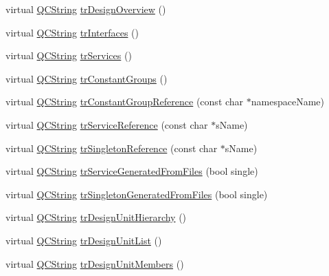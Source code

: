 \begin{DoxyCompactItemize}
\item 
virtual \mbox{\hyperlink{class_q_c_string}{Q\+C\+String}} \mbox{\hyperlink{class_translator_brazilian_a6c56d700811ad7ff20830d9b39981a77}{tr\+Design\+Overview}} ()
\item 
virtual \mbox{\hyperlink{class_q_c_string}{Q\+C\+String}} \mbox{\hyperlink{class_translator_brazilian_ac9b77c3549f6537d9a02cc578773f141}{tr\+Interfaces}} ()
\item 
virtual \mbox{\hyperlink{class_q_c_string}{Q\+C\+String}} \mbox{\hyperlink{class_translator_brazilian_a7106ab79ca10e6325f9c213a73d1567c}{tr\+Services}} ()
\item 
virtual \mbox{\hyperlink{class_q_c_string}{Q\+C\+String}} \mbox{\hyperlink{class_translator_brazilian_a833f4cbad1bcdc584e53cae87e41bc66}{tr\+Constant\+Groups}} ()
\item 
virtual \mbox{\hyperlink{class_q_c_string}{Q\+C\+String}} \mbox{\hyperlink{class_translator_brazilian_a539c22bdd139b9d7b602726e8e8f51ed}{tr\+Constant\+Group\+Reference}} (const char $\ast$namespace\+Name)
\item 
virtual \mbox{\hyperlink{class_q_c_string}{Q\+C\+String}} \mbox{\hyperlink{class_translator_brazilian_a94bb3561d391d1c5280ff13c2ff558af}{tr\+Service\+Reference}} (const char $\ast$s\+Name)
\item 
virtual \mbox{\hyperlink{class_q_c_string}{Q\+C\+String}} \mbox{\hyperlink{class_translator_brazilian_a3208b6bc387352fe8ae53116e9c667db}{tr\+Singleton\+Reference}} (const char $\ast$s\+Name)
\item 
virtual \mbox{\hyperlink{class_q_c_string}{Q\+C\+String}} \mbox{\hyperlink{class_translator_brazilian_ab3a7ade1f86f8dd57b21d558a7938580}{tr\+Service\+Generated\+From\+Files}} (bool single)
\item 
virtual \mbox{\hyperlink{class_q_c_string}{Q\+C\+String}} \mbox{\hyperlink{class_translator_brazilian_ac03458a3cc3abe0cd2ad398e4577e2b6}{tr\+Singleton\+Generated\+From\+Files}} (bool single)
\item 
virtual \mbox{\hyperlink{class_q_c_string}{Q\+C\+String}} \mbox{\hyperlink{class_translator_brazilian_a5dbd5be4d7a936f633c55eb7d085de49}{tr\+Design\+Unit\+Hierarchy}} ()
\item 
virtual \mbox{\hyperlink{class_q_c_string}{Q\+C\+String}} \mbox{\hyperlink{class_translator_brazilian_abf24e66004716ddc77f72906ed9a0cc9}{tr\+Design\+Unit\+List}} ()
\item 
virtual \mbox{\hyperlink{class_q_c_string}{Q\+C\+String}} \mbox{\hyperlink{class_translator_brazilian_a417b92f02d50b8b93df5156a129c7b8f}{tr\+Design\+Unit\+Members}} ()

\end{DoxyCompactItemize}
